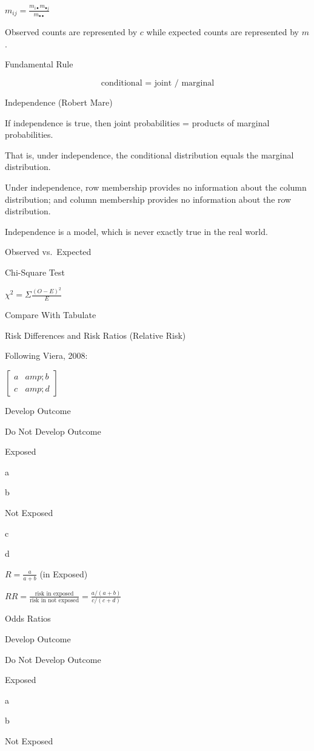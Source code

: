 \documentclass[
]{article}
\begin{document}
{\(m_{ij} = \frac{m_{i \bullet} m_{\bullet j}}{m_{\bullet \bullet}}\)}

Observed counts are represented by {\(c\)} while expected counts are represented by {\(m\)}.

Fundamental Rule

{\[\text{conditional = joint / marginal}\]}

Independence (Robert Mare)

If independence is true, then joint probabilities = products of marginal probabilities.

That is, under independence, the conditional distribution equals the marginal distribution.

Under independence, row membership provides no information about the column distribution; and column membership provides no information about the row distribution.

Independence is a model, which is never exactly true in the real world.

Observed vs.~Expected

Chi-Square Test

{\(\chi^2 = \Sigma \frac{(O-E)^2}{E}\)}

Compare With Tabulate

Risk Differences and Risk Ratios (Relative Risk)

Following Viera, 2008:

{\(\begin{bmatrix}a &amp; b \\ c &amp; d\end{bmatrix}\)}

Develop Outcome

Do Not Develop Outcome

Exposed

a

b

Not Exposed

c

d

{\(R = \frac{a}{a+b}\)} (in Exposed)

{\(RR =\frac{\text{risk in exposed}}{\text{risk in not exposed}} = \frac{a/(a+b)}{c/(c+d)}\)}

Odds Ratios

Develop Outcome

Do Not Develop Outcome

Exposed

a

b

Not Exposed
\end{document}
